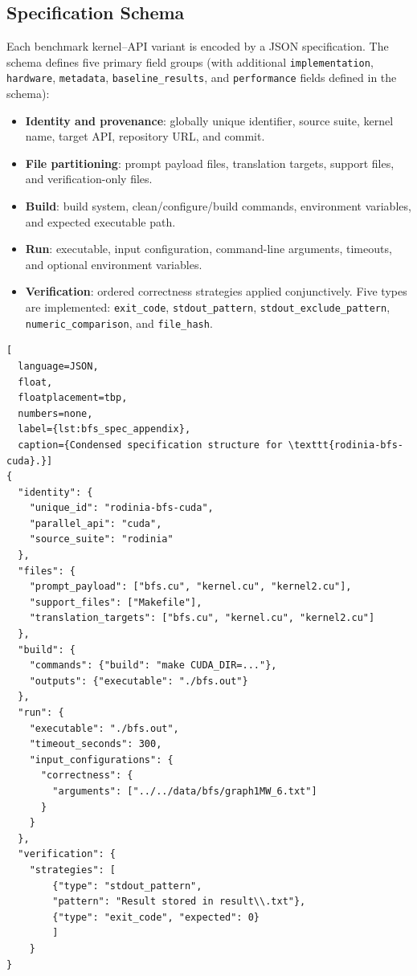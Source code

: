 \subsection{Specification Schema}
\label{sec:appendix-a-schema}

Each benchmark kernel–API variant is encoded by a JSON specification. The schema defines five primary field groups (with additional \texttt{implementation}, \texttt{hardware}, \texttt{metadata}, \texttt{baseline\_results}, and \texttt{performance} fields defined in the schema):

\begin{itemize}
    \item \textbf{Identity and provenance}: globally unique identifier, source suite, kernel name, target API, repository URL, and commit.
    \item \textbf{File partitioning}: prompt payload files, translation targets, support files, and verification-only files.
    \item \textbf{Build}: build system, clean/configure/build commands, environment variables, and expected executable path.
    \item \textbf{Run}: executable, input configuration, command-line arguments, timeouts, and optional environment variables.
    \item \textbf{Verification}: ordered correctness strategies applied conjunctively. Five types are implemented: \texttt{exit\_code}, \texttt{stdout\_pattern}, \texttt{stdout\_exclude\_pattern}, \texttt{numeric\_comparison}, and \texttt{file\_hash}.
\end{itemize}

\begin{lstlisting}[
  language=JSON,
  float,
  floatplacement=tbp,
  numbers=none,
  label={lst:bfs_spec_appendix},
  caption={Condensed specification structure for \texttt{rodinia-bfs-cuda}.}]
{
  "identity": {
    "unique_id": "rodinia-bfs-cuda",
    "parallel_api": "cuda",
    "source_suite": "rodinia"
  },
  "files": {
    "prompt_payload": ["bfs.cu", "kernel.cu", "kernel2.cu"],
    "support_files": ["Makefile"],
    "translation_targets": ["bfs.cu", "kernel.cu", "kernel2.cu"]
  },
  "build": {
    "commands": {"build": "make CUDA_DIR=..."},
    "outputs": {"executable": "./bfs.out"}
  },
  "run": {
    "executable": "./bfs.out",
    "timeout_seconds": 300,
    "input_configurations": {
      "correctness": {
        "arguments": ["../../data/bfs/graph1MW_6.txt"]
      }
    }
  },
  "verification": {
    "strategies": [
        {"type": "stdout_pattern",
        "pattern": "Result stored in result\\.txt"},
        {"type": "exit_code", "expected": 0}
        ]
    }
}
\end{lstlisting}

